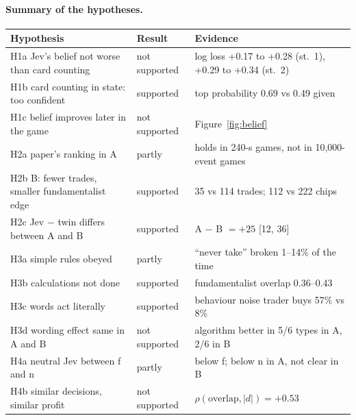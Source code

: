\paragraph{Summary of the hypotheses.}
\begin{center}\footnotesize
\begin{tabular}{@{}lll@{}}
\toprule
Hypothesis & Result & Evidence \\
\midrule
H1a Jev's belief not worse than card counting & not supported & log loss +0.17 to +0.28 (st.~1), +0.29 to +0.34 (st.~2) \\
H1b card counting in state: too confident & supported & top probability 0.69 vs 0.49 given \\
H1c belief improves later in the game & not supported & Figure~\ref{fig:belief} \\
H2a paper's ranking in A & partly & holds in 240-s games, not in 10,000-event games \\
H2b B: fewer trades, smaller fundamentalist edge & supported & 35 vs 114 trades; 112 vs 222 chips \\
H2c Jev $-$ twin differs between A and B & supported & A $-$ B $= +25$ [12, 36] \\
H3a simple rules obeyed & partly & ``never take'' broken 1--14\% of the time \\
H3b calculations not done & supported & fundamentalist overlap 0.36--0.43 \\
H3c words act literally & supported & behaviour noise trader buys 57\% vs 8\% \\
H3d wording effect same in A and B & not supported & algorithm better in 5/6 types in A, 2/6 in B \\
H4a neutral Jev between f and n & partly & below f; below n in A, not clear in B \\
H4b similar decisions, similar profit & not supported & $\rho(\text{overlap}, |d|) = +0.53$ \\
\bottomrule
\end{tabular}
\end{center}

